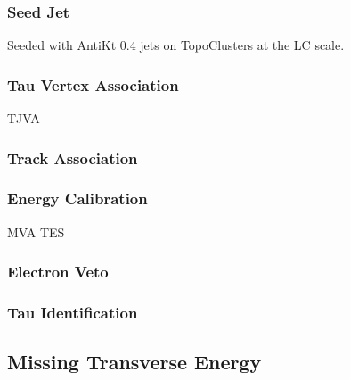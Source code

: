 \subsubsection{Seed Jet}

Seeded with AntiKt 0.4 jets on TopoClusters at the LC scale.

\subsubsection{Tau Vertex Association}

TJVA

\subsubsection{Track Association}

\cite{duschinger}


\subsubsection{Energy Calibration}

MVA TES

\subsubsection{Electron Veto}
\subsubsection{Tau Identification}

\subsection{Missing Transverse Energy}

